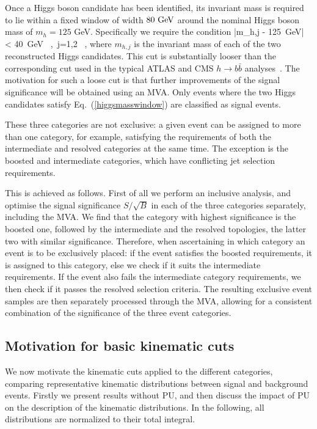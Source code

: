 Once a Higgs boson candidate has been identified,
its invariant mass is required to lie within a fixed window
of width $80~{\rm GeV}$ around the nominal Higgs boson mass of $m_h= 125$
GeV.
%
Specifically we require the condition
\be
\label{higgsmasswindow}
|m_{h,j} - 125~{\rm GeV}| < 40~{\rm GeV} \, ,\, j=1,2 \, ,
\ee
where $m_{h,j}$ is the invariant mass of each of the two reconstructed  Higgs candidates.
%
This cut is substantially looser than the corresponding
cut used in the typical ATLAS and CMS $h\to b\bar{b}$
analyses~\cite{Aad:2012gxa,Chatrchyan:2013zna}.
%
The motivation
for such a loose cut 
is that further improvements of the
signal significance will be obtained using an MVA.
%
Only events where the two Higgs candidates satisfy
Eq.~(\ref{higgsmasswindow}) are classified as signal events.
%

These three categories are not exclusive:
a given event can be assigned to more than one category, for
example, satisfying the requirements of both the intermediate
and resolved
categories at the same time.
%
The exception is the boosted and intermediate categories, which have
conflicting jet selection requirements.
%

This is achieved as follows.
First of all we perform an inclusive analysis, and optimise the
signal significance
$S/\sqrt{B}$ in each of the three categories separately, including
the MVA.
%
We find that the category with highest significance is
the boosted one,
followed by the intermediate and the resolved topologies, the latter two
with similar significance.
%
Therefore, when ascertaining in
which category an event is to be exclusively placed:
if the event satisfies the boosted requirements, it is assigned to
this category, else we check if it suits the intermediate
requirements.
%
If the event also fails the intermediate category
requirements, we
then check if it passes the resolved selection criteria.
%
The resulting exclusive event samples are then separately processed
through the MVA, allowing for a consistent combination
of the significance of the three event categories.

\subsection{Motivation for basic kinematic cuts}

We now motivate the
kinematic cuts applied to the different categories, 
comparing representative kinematic distributions between
signal and background events.
%
Firstly we present results without PU, and then
discuss
the impact of PU
on the description of the kinematic
distributions.
%
In the following, all
distributions are normalized to their total integral.


